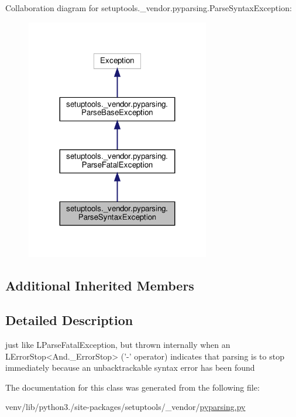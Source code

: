 Collaboration diagram for setuptools.\+\_\+vendor.\+pyparsing.\+Parse\+Syntax\+Exception\+:
\nopagebreak
\begin{figure}[H]
\begin{center}
\leavevmode
\includegraphics[width=227pt]{classsetuptools_1_1__vendor_1_1pyparsing_1_1ParseSyntaxException__coll__graph}
\end{center}
\end{figure}
\subsection*{Additional Inherited Members}


\subsection{Detailed Description}
\begin{DoxyVerb}just like L{ParseFatalException}, but thrown internally when an
   L{ErrorStop<And._ErrorStop>} ('-' operator) indicates that parsing is to stop 
   immediately because an unbacktrackable syntax error has been found\end{DoxyVerb}
 

The documentation for this class was generated from the following file\+:\begin{DoxyCompactItemize}
\item 
venv/lib/python3./site-\/packages/setuptools/\+\_\+vendor/\hyperlink{setuptools_2__vendor_2pyparsing_8py}{pyparsing.\+py}\end{DoxyCompactItemize}
